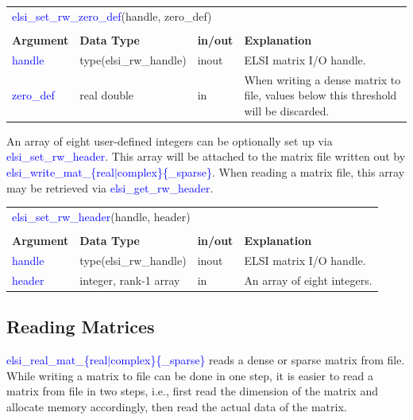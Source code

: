 \documentclass{report}
\newcommand{\tcb}[1]{\textcolor{blue}{#1}}
\begin{document}
\begin{tabular}[]{|p{20mm}|p{45mm}|p{15mm}|p{85mm}|}
\multicolumn{4}{l}{\tcb{elsi\_set\_rw\_zero\_def}(handle, zero\_def)}\\
\multicolumn{4}{l}{}\\
\hline
\multicolumn{1}{|l|}{\textbf{Argument}} & \multicolumn{1}{l|}{\textbf{Data Type}} & \multicolumn{1}{l|}{\textbf{in/out}} & \multicolumn{1}{l|}{\textbf{Explanation}}\\
\hline
\tcb{handle}    & type(elsi\_rw\_handle) & inout & ELSI matrix I/O handle.\\
\hline
\tcb{zero\_def} & real double            & in    & When writing a dense matrix to file, values below this threshold will be discarded.\\
\hline
\end{tabular}

An array of eight user-defined integers can be optionally set up via \tcb{elsi\_set\_rw\_header}. This array will be attached to the matrix file written out by \tcb{elsi\_write\_mat\_\{real$\vert$complex\}\{\_sparse\}}. When reading a matrix file, this array may be retrieved via \tcb{elsi\_get\_rw\_header}.

\begin{tabular}[]{|p{20mm}|p{45mm}|p{15mm}|p{85mm}|}
\multicolumn{4}{l}{\tcb{elsi\_set\_rw\_header}(handle, header)}\\
\multicolumn{4}{l}{}\\
\hline
\multicolumn{1}{|l|}{\textbf{Argument}} & \multicolumn{1}{l|}{\textbf{Data Type}} & \multicolumn{1}{l|}{\textbf{in/out}} & \multicolumn{1}{l|}{\textbf{Explanation}}\\
\hline
\tcb{handle} & type(elsi\_rw\_handle) & inout & ELSI matrix I/O handle.\\
\hline
\tcb{header} & integer, rank-1 array  & in    & An array of eight integers.\\
\hline
\end{tabular}

\subsection{Reading Matrices}
\label{subsec:rw_read}
\tcb{elsi\_real\_mat\_\{real$\vert$complex\}\{\_sparse\}} reads a dense or sparse matrix from file. While writing a matrix to file can be done in one step, it is easier to read a matrix from file in two steps, i.e., first read the dimension of the matrix and allocate memory accordingly, then read the actual data of the matrix.
\end{document}
